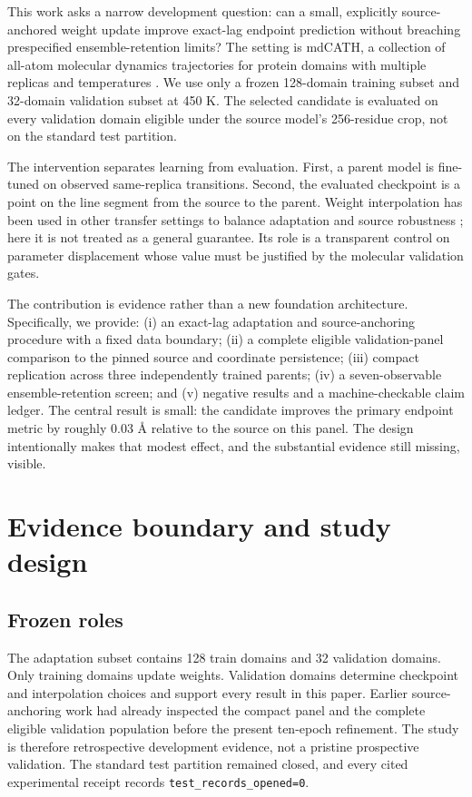 \documentclass{article}
\begin{document}
This work asks a narrow development question: can a small, explicitly source-anchored weight update improve exact-lag endpoint prediction without breaching prespecified ensemble-retention limits? The setting is mdCATH, a collection of all-atom molecular dynamics trajectories for protein domains with multiple replicas and temperatures \citep{mirarchi2024mdcath}. We use only a frozen 128-domain training subset and 32-domain validation subset at 450 K. The selected candidate is evaluated on every validation domain eligible under the source model's 256-residue crop, not on the standard test partition.

The intervention separates learning from evaluation. First, a parent model is fine-tuned on observed same-replica transitions. Second, the evaluated checkpoint is a point on the line segment from the source to the parent. Weight interpolation has been used in other transfer settings to balance adaptation and source robustness \citep{wortsman2022robust}; here it is not treated as a general guarantee. Its role is a transparent control on parameter displacement whose value must be justified by the molecular validation gates.

The contribution is evidence rather than a new foundation architecture. Specifically, we provide: (i) an exact-lag adaptation and source-anchoring procedure with a fixed data boundary; (ii) a complete eligible validation-panel comparison to the pinned source and coordinate persistence; (iii) compact replication across three independently trained parents; (iv) a seven-observable ensemble-retention screen; and (v) negative results and a machine-checkable claim ledger. The central result is small: the candidate improves the primary endpoint metric by roughly $0.03$ \AA\@{} relative to the source on this panel. The design intentionally makes that modest effect, and the substantial evidence still missing, visible.

\section{Evidence boundary and study design}

\subsection{Frozen roles}

The adaptation subset contains 128 train domains and 32 validation domains. Only training domains update weights. Validation domains determine checkpoint and interpolation choices and support every result in this paper. Earlier source-anchoring work had already inspected the compact panel and the complete eligible validation population before the present ten-epoch refinement. The study is therefore retrospective development evidence, not a pristine prospective validation. The standard test partition remained closed, and every cited experimental receipt records \texttt{test\_records\_opened=0}.
\end{document}
